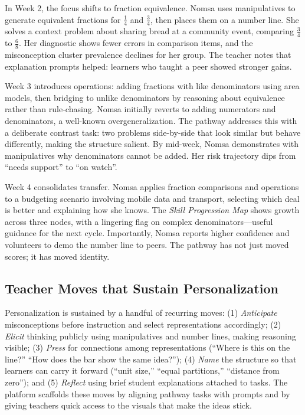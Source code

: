 In Week 2, the focus shifts to fraction equivalence. Nomsa uses manipulatives to generate equivalent fractions for $\tfrac{1}{4}$ and $\tfrac{3}{4}$, then places them on a number line. She solves a context problem about sharing bread at a community event, comparing $\tfrac{3}{4}$ to $\tfrac{6}{8}$. Her diagnostic shows fewer errors in comparison items, and the misconception cluster prevalence declines for her group. The teacher notes that explanation prompts helped: learners who taught a peer showed stronger gains.

Week 3 introduces operations: adding fractions with like denominators using area models, then bridging to unlike denominators by reasoning about equivalence rather than rule-chasing. Nomsa initially reverts to adding numerators and denominators, a well-known overgeneralization. The pathway addresses this with a deliberate contrast task: two problems side-by-side that look similar but behave differently, making the structure salient. By mid-week, Nomsa demonstrates with manipulatives why denominators cannot be added. Her risk trajectory dips from ``needs support'' to ``on watch''.

Week 4 consolidates transfer. Nomsa applies fraction comparisons and operations to a budgeting scenario involving mobile data and transport, selecting which deal is better and explaining how she knows. The \emph{Skill Progression Map} shows growth across three nodes, with a lingering flag on complex denominators---useful guidance for the next cycle. Importantly, Nomsa reports higher confidence and volunteers to demo the number line to peers. The pathway has not just moved scores; it has moved identity.

\subsection{Teacher Moves that Sustain Personalization}

Personalization is sustained by a handful of recurring moves: (1) \emph{Anticipate} misconceptions before instruction and select representations accordingly; (2) \emph{Elicit} thinking publicly using manipulatives and number lines, making reasoning visible; (3) \emph{Press} for connections among representations (``Where is this on the line?'' ``How does the bar show the same idea?''); (4) \emph{Name} the structure so that learners can carry it forward (``unit size,'' ``equal partitions,'' ``distance from zero''); and (5) \emph{Reflect} using brief student explanations attached to tasks. The platform scaffolds these moves by aligning pathway tasks with prompts and by giving teachers quick access to the visuals that make the ideas stick.
